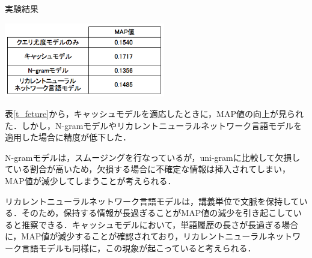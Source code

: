 \begin{table}[h]
    \centering
    \caption{実験結果}
    \includegraphics[width=7cm]{./image/t_feature2.png}
    \label{t_feture_res}
\end{table}

表\ref{t_feture}から，キャッシュモデルを適応したときに，MAP値の向上が見られた．しかし，N-gramモデルやリカレントニューラルネットワーク言語モデルを適用した場合に精度が低下した． 

N-gramモデルは，スムージングを行なっているが，uni-gramに比較して欠損している割合が高いため，欠損する場合に不確定な情報は挿入されてしまい，MAP値が減少してしまうことが考えられる．

リカレントニューラルネットワーク言語モデルは，講義単位で文脈を保持している．そのため，保持する情報が長過ぎることがMAP値の減少を引き起こしていると推察できる．キャッシュモデルにおいて，単語履歴の長さが長過ぎる場合に，MAP値が減少することが確認されており，リカレントニューラルネットワーク言語モデルも同様に，この現象が起こっていると考えられる．